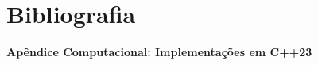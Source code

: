 \pagestyle{empty}
\renewcommand{\contentsname}{Sumário}
\setcounter{tocdepth}{1}
\tableofcontents
\clearpage

\pagestyle{textual}


\vspace{0.35cm}


\clearpage


\clearpage









\newpage
\section{Bibliografia}



\newpage
\appendix
\renewcommand{\theHsection}{apendice.\arabic{section}}
\providecommand{\apendice}[1]{\section{#1}}



\newpage
\begin{center}{\Large\textbf{Apêndice Computacional: Implementações em C++23}}\end{center}





